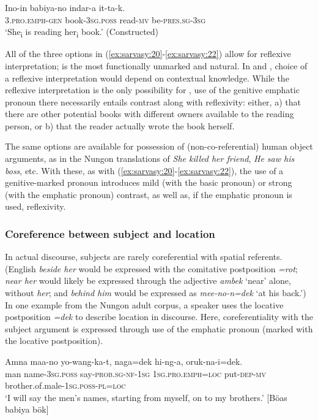 \documentclass[output=paper,colorlinks,citecolor=brown]{langscibook}
\begin{document}
\ea%
    \label{ex:sarvasy:22}
    \gll    Ino-in      babiya-no  indar-a    it-ta-k.\\
            \textsc{3.pro.emph-gen}  book\textsc{{}-3sg.poss} read\textsc{{}-mv} be\textsc{{}-pres.sg-3sg}\\
    \glt    ‘She\textsubscript{i} is reading her\textsubscript{i} book.’ (Constructed)
\z

All of the three options in (\ref{ex:sarvasy:20}-\ref{ex:sarvasy:22}) allow for reflexive interpretation;  is the most functionally unmarked and natural. In  and , choice of a reflexive interpretation would depend on contextual knowledge. While the reflexive interpretation is the only possibility for , use of the genitive emphatic pronoun there necessarily entails contrast along with reflexivity: either, a) that there are other potential books with different owners available to the reading person, or b) that the reader actually wrote the book herself.

The same options are available for possession of (non-co-referential) human object arguments, as in the Nungon translations of \textit{She killed her friend}, \textit{He saw his boss}, etc. With these, as with (\ref{ex:sarvasy:20}-\ref{ex:sarvasy:22}), the use of a genitive-marked pronoun introduces mild (with the basic pronoun) or strong (with the emphatic pronoun) contrast, as well as, if the emphatic pronoun is used, reflexivity.

\subsubsection{Coreference between subject and location}\label{sec:sarvasy:3.3.2}

In actual discourse, subjects are rarely coreferential with spatial referents. (English \textit{beside her} would be expressed with the comitative postposition \textit{=rot}; \textit{near her} would likely be expressed through the adjective \textit{ambek} ‘near’ alone, without \textit{her}; and \textit{behind him} would be expressed as \textit{mee\nobreakdash-no-n=dek} ‘at his back.’) In one example from the Nungon adult corpus, a speaker uses the locative postposition \textit{=dek} to describe location in discourse. Here, coreferentiality with the subject argument is expressed through use of the emphatic pronoun (marked with the locative postposition).

\ea%
    \label{ex:sarvasy:23}
    \gll    Amna   maa-no    yo-wang-ka-t,     naga=dek    hi-ng-a,  oruk-na-i=dek.\\
            man  name-\textsc{3sg.poss}  say-\textsc{prob.sg-nf-1sg}   \textsc{1sg.pro.emph=loc}  put-\textsc{dep-mv} brother.of.male-\textsc{1sg.poss-pl=loc}\\
    \glt    ‘I will say the men’s names, starting from myself, on to my brothers.’ [Böas babiya bök]
\z
\end{document}
